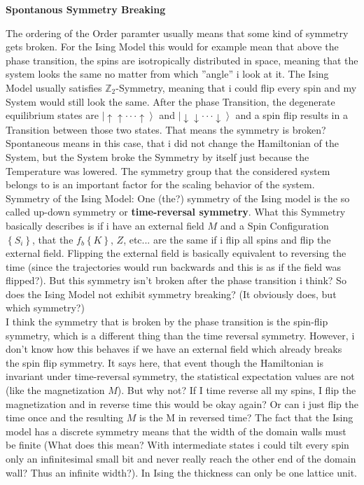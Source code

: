 	\newline
	\newline
	\textbf{Spontanous Symmetry Breaking}
	
	The ordering of the Order paramter usually means that some kind of symmetry gets broken. For the Ising Model this would for example mean that above the phase transition, the spins are isotropically distributed in space, meaning that the system looks the same no matter from which ''angle'' i look at it. The Ising Model usually satisfies $\mathbb{Z}_2$-Symmetry, meaning that i could flip every spin and my System would still look the same. After the phase Transition, the degenerate equilibrium states are $\left|\uparrow \uparrow \cdot \cdot \cdot \uparrow \right\rangle$ and $\left|\downarrow \downarrow \cdot \cdot \cdot \downarrow \right\rangle$ and a spin flip results in a Transition between those two states. That means the symmetry is broken? Spontaneous means in this case, that i did not change the Hamiltonian of the System, but the System broke the Symmetry by itself just because the Temperature was lowered. The symmetry group that the considered system belongs to is an important factor for the scaling behavior of the system. \\
	
	Symmetry of the Ising Model: One (the?) symmetry of the Ising model is the so called up-down symmetry or \textbf{time-reversal symmetry}. What this Symmetry basically describes is if i have an external field $M$ and a Spin Configuration $\left\lbrace S_i \right\rbrace$, that the $f_b\left\lbrace K \right\rbrace$, $Z$, etc... are the same if i flip all spins and flip the external field. Flipping the external field is basically equivalent to reversing the time (since the trajectories would run backwards and this is as if the field was flipped?). But this symmetry isn't broken after the phase transition i think? So does the Ising Model not exhibit symmetry breaking? (It obviously does, but which symmetry?) \\
	
	I think the symmetry that is broken by the phase transition is the spin-flip symmetry, which is a different thing than the time reversal symmetry. However, i don't know how this behaves if we have an external field which already breaks the spin flip symmetry. It says here, that event though the Hamiltonian is invariant under time-reversal symmetry, the statistical expectation values are not (like the magnetization $M$). But why not? If I time reverse all my spins, I flip the magnetization and in reverse time this would be okay again? Or can i just flip the time once and the resulting $M$ is the M in reversed time? The fact that the Ising model has a discrete symmetry means that the width of the domain walls must be finite (What does this mean? With intermediate states i could tilt every spin only an infinitesimal small bit and never really reach the other end of the domain wall? Thus an infinite width?). In Ising the thickness can only be one lattice unit. \\
	
